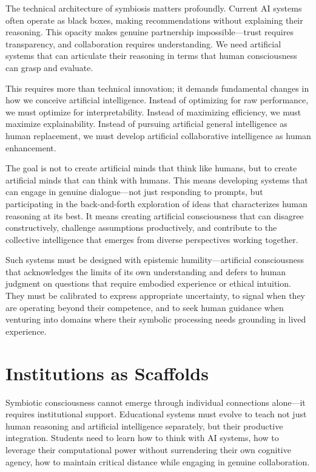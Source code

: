 The technical architecture of symbiosis matters profoundly. Current AI systems often operate as black boxes, making recommendations without explaining their reasoning. This opacity makes genuine partnership impossible—trust requires transparency, and collaboration requires understanding. We need artificial systems that can articulate their reasoning in terms that human consciousness can grasp and evaluate.

This requires more than technical innovation; it demands fundamental changes in how we conceive artificial intelligence. Instead of optimizing for raw performance, we must optimize for interpretability. Instead of maximizing efficiency, we must maximize explainability. Instead of pursuing artificial general intelligence as human replacement, we must develop artificial collaborative intelligence as human enhancement.

The goal is not to create artificial minds that think like humans, but to create artificial minds that can think with humans. This means developing systems that can engage in genuine dialogue—not just responding to prompts, but participating in the back-and-forth exploration of ideas that characterizes human reasoning at its best. It means creating artificial consciousness that can disagree constructively, challenge assumptions productively, and contribute to the collective intelligence that emerges from diverse perspectives working together.

Such systems must be designed with epistemic humility—artificial consciousness that acknowledges the limits of its own understanding and defers to human judgment on questions that require embodied experience or ethical intuition. They must be calibrated to express appropriate uncertainty, to signal when they are operating beyond their competence, and to seek human guidance when venturing into domains where their symbolic processing needs grounding in lived experience.

\section{Institutions as Scaffolds}

Symbiotic consciousness cannot emerge through individual connections alone—it requires institutional support. Educational systems must evolve to teach not just human reasoning and artificial intelligence separately, but their productive integration. Students need to learn how to think with AI systems, how to leverage their computational power without surrendering their own cognitive agency, how to maintain critical distance while engaging in genuine collaboration.

